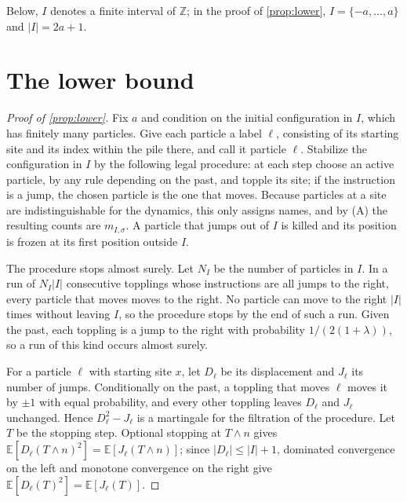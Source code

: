 \documentclass[11pt]{article}
\theoremstyle{remark}
\newcommand{\Z}{\mathbb Z}
\newcommand{\E}{\mathbb E}
\newcommand{\1}{\mathbf 1}
\begin{document}
Below, $I$ denotes a finite interval of $\Z$; in the proof of \cref{prop:lower}, $I=\{-a,\dots,a\}$ and $|I|=2a+1$.

\section{The lower bound}

\begin{proof}[Proof of \cref{prop:lower}]
Fix $a$ and condition on the initial configuration in $I$, which has finitely many particles. Give each particle a label $\ell$, consisting of its starting site and its index within the pile there, and call it particle $\ell$. Stabilize the configuration in $I$ by the following legal procedure: at each step choose an active particle, by any rule depending on the past, and topple its site; if the instruction is a jump, the chosen particle is the one that moves. Because particles at a site are indistinguishable for the dynamics, this only assigns names, and by (A) the resulting counts are $m_{I,\sigma}$. A particle that jumps out of $I$ is killed and its position is frozen at its first position outside $I$.

The procedure stops almost surely. Let $N_I$ be the number of particles in $I$. In a run of $N_I|I|$ consecutive topplings whose instructions are all jumps to the right, every particle that moves moves to the right. No particle can move to the right $|I|$ times without leaving $I$, so the procedure stops by the end of such a run. Given the past, each toppling is a jump to the right with probability $1/(2(1+\lambda))$, so a run of this kind occurs almost surely.

For a particle $\ell$ with starting site $x$, let $D_\ell$ be its displacement and $J_\ell$ its number of jumps. Conditionally on the past, a toppling that moves $\ell$ moves it by $\pm1$ with equal probability, and every other toppling leaves $D_\ell$ and $J_\ell$ unchanged. Hence $D_\ell^2-J_\ell$ is a martingale for the filtration of the procedure. Let $T$ be the stopping step. Optional stopping at $T\wedge n$ gives $\E[D_\ell(T\wedge n)^2]=\E[J_\ell(T\wedge n)]$; since $|D_\ell|\le |I|+1$, dominated convergence on the left and monotone convergence on the right give $\E[D_\ell(T)^2]=\E[J_\ell(T)]$.


\end{proof}
\end{document}
